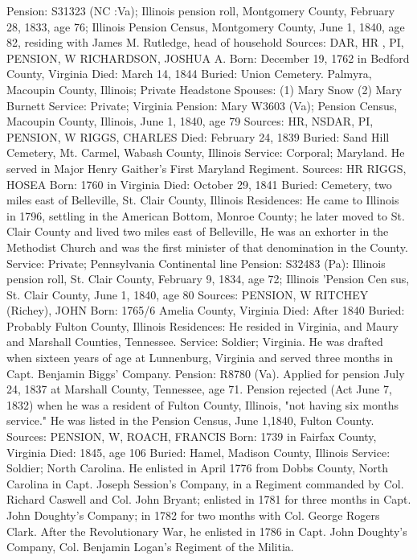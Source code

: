 Pension: S31323 (NC :Va); Illinois pension roll, Montgomery County, February 28, 1833, age 76; Illinois Pension Census, Montgomery County, June 1, 1840, age 82, residing with James M. Rutledge, head of household 
Sources: DAR, HR , PI, PENSION, W 
RICHARDSON, JOSHUA A. 
Born: December 19, 1762 in Bedford County, Virginia 
Died:  March 14, 1844
Buried: Union Cemetery. Palmyra, Macoupin County, Illinois; Private Headstone 
Spouses:  (1) Mary Snow
	(2) Mary Burnett 
Service: Private; Virginia 
Pension: Mary W3603 (Va); Pension Census, Macoupin County, Illinois, June 1, 1840, age 79
Sources: HR, NSDAR, PI, PENSION, W 
RIGGS, CHARLES
Died: February 24, 1839
Buried: Sand Hill Cemetery, Mt. Carmel, Wabash County, Illinois
Service: Corporal; Maryland. He served in Major Henry Gaither's First Maryland Regiment.
Sources: HR 
RIGGS, HOSEA
Born: 1760 in Virginia
Died:  October 29, 1841
Buried: Cemetery, two miles east of Belleville, St. Clair County, Illinois
Residences: He came to Illinois in 1796, settling in the American Bottom, Mon­roe County; he later moved to St. Clair County and lived two miles east of Belleville, He was an exhorter in the Methodist Church and was the first minister of that denomination in the County. 
Service: Private; Pennsylvania Continental line 
Pension: S32483 (Pa): Illinois pension roll, St. Clair County, February 9, 1834, age 72; Illinois 'Pension Cen sus, St. Clair County, June 1, 1840, age 80
Sources: PENSION, W 
RITCHEY (Richey), JOHN
Born: 1765/6 Amelia County, Virginia
Died: After 1840
Buried: Probably Fulton County, Illinois
Residences: He resided in Virginia, and Maury and Marshall Counties, Tennessee.
Service: Soldier; Virginia. He was drafted when sixteen years of age at Lunnen­burg, Virginia and served three months in Capt. Benjamin Biggs' Company. 
Pension: R8780 (Va). Applied for pension July 24, 1837 at Marshall County, Tennessee, age 71. Pension rejected (Act June 7, 1832) when he was a resi­dent of Fulton County, Illinois, "not having six months service." He was listed in the Pension Census, June 1,1840, Fulton County.
Sources: PENSION, W, 
ROACH, FRANCIS 
Born: 1739 in Fairfax County, Virginia 
Died: 1845, age 106 
Buried: Hamel, Madison County, Illinois
Service: Soldier; North Carolina. He enlisted in April 1776 from Dobbs County, North Carolina in Capt. Joseph Session's Company, in a Regiment com­manded by Col. Richard Caswell and Col. John Bryant; enlisted in 1781 for three months in Capt. John Doughty's Company; in 1782 for two months with Col. George Rogers Clark. After the Revolutionary War, he enlisted in 1786 in Capt. John Doughty's Company, Col. Benjamin Logan's Regiment of the Militia. 
